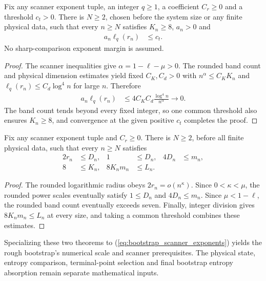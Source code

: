 \begin{lemma}
    \label{thm:fixed_weight_four_transport_smallness}
    \leanok
    Fix any scanner exponent tuple, an integer $q\geq1$, a coefficient
    $C_r\geq0$ and a threshold $c_t>0$.
    There is $N\geq2$, chosen before the system size or any finite
    physical data, such that every $n\geq N$ satisfies
    $K_n\geq8$, $a_n>0$ and
    \begin{align}
        a_n\ell_q(r_n) & \leq c_t.
        \label{eq:fixed_weight_four_transport_smallness}
    \end{align}
    No sharp-comparison exponent margin is assumed.
\end{lemma}
\begin{proof}
    \leanok
    The scanner inequalities give $\alpha=1-\ell-\mu>0$.
    The rounded band count and physical dimension estimates yield fixed
    $C_K,C_d>0$ with
    $n^\alpha\leq C_KK_n$ and
    $\ell_q(r_n)\leq C_d\log^4n$ for large $n$.
    Therefore
    \begin{align}
        a_n\ell_q(r_n)
         & \leq4C_KC_d\frac{\log^4n}{n^\alpha}
        \longrightarrow0.
        \label{eq:fixed_weight_four_transport_decay}
    \end{align}
    The band count tends beyond every fixed integer, so one common
    threshold also ensures $K_n\geq8$, and convergence at the given
    positive $c_t$ completes the proof.
\end{proof}

\begin{lemma}
    \label{thm:scanner_rounded_admissibility}
    \leanok
    Fix any scanner exponent tuple and $C_r\geq0$.
    There is $N\geq2$, before all finite physical data, such that every
    $n\geq N$ satisfies
    \begin{align}
        2r_n & \leq D_n,
             & 1         & \leq D_n,
             & 4D_n      & \leq m_n,\nonumber \\
        8    & \leq K_n,
             & 8K_nm_n   & \leq L_n.
        \label{eq:scanner_rounded_admissibility}
    \end{align}
\end{lemma}
\begin{proof}
    \leanok
    The rounded logarithmic radius obeys $2r_n=o(n^\kappa)$.
    Since $0<\kappa<\mu$, the rounded power scales eventually satisfy
    $1\leq D_n$ and $4D_n\leq m_n$.
    Since $\mu<1-\ell$, the rounded band count eventually exceeds seven.
    Finally, integer division gives $8K_nm_n\leq L_n$ at every size, and
    taking a common threshold combines these estimates.
\end{proof}

Specializing these two theorems to
(\ref{eq:bootstrap_scanner_exponents}) yields the rough bootstrap's
numerical scale and scanner prerequisites.
The physical state, entropy comparison, terminal-point selection and final
bootstrap entropy absorption remain separate mathematical inputs.

